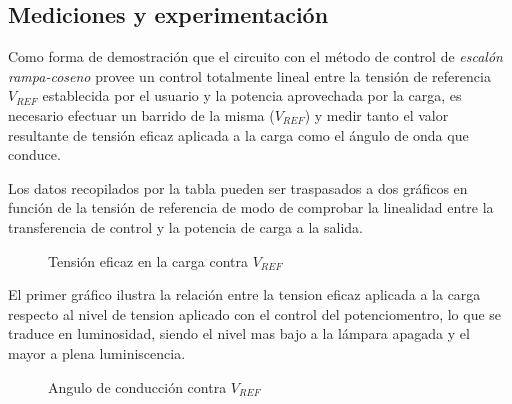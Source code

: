 \documentclass{article}
\begin{document}
\clearpage

\subsection{Mediciones y experimentación}

Como forma de demostración que el circuito con el método de control de \textit{escalón rampa-coseno} provee un control totalmente lineal entre la tensión de referencia $V_{REF}$ establecida por el usuario y la potencia aprovechada por la carga, es necesario efectuar un barrido de la misma ($V_{REF}$) y medir tanto el valor resultante de tensión eficaz aplicada a la carga como el ángulo de onda que conduce.
\begin{center}
\end{center}
%
Los datos recopilados por la tabla pueden ser traspasados a dos gráficos en función de la tensión de referencia de modo de comprobar la linealidad entre la transferencia de control y la potencia de carga a la salida.
%
\begin{figure}[h!]
\centering
{}
	\caption{Tensión eficaz en la carga contra $V_{REF}$ }
\end{figure}

El primer gráfico ilustra la relación entre la tension eficaz aplicada a la carga respecto al nivel de tension aplicado con el control del potenciomentro, lo que se traduce en luminosidad, siendo el nivel mas bajo a la lámpara apagada y el mayor a plena luminiscencia.

\begin{figure}[h]
\centering
{}
	\caption{Angulo de conducción contra $V_{REF}$ }
\end{figure}
\end{document}
